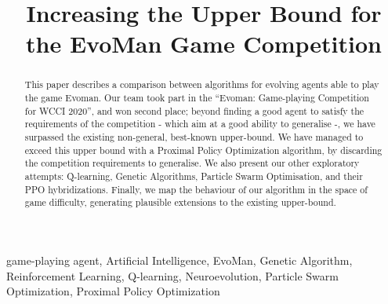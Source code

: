 \documentclass[conference]{IEEEtran}
\begin{document}
    \title{Increasing the Upper Bound for the EvoMan Game Competition}

    \author{
          \and
          
      
        \and
      }

    \maketitle

    \begin{abstract}
      This paper describes a comparison between algorithms for evolving agents able to play the game Evoman.
      Our team took part in the ``Evoman: Game-playing Competition for WCCI 2020'', and won second place;
      beyond finding a good agent to satisfy the requirements of the competition - which aim at a good ability to generalise -,
      we have surpassed the existing non-general, best-known upper-bound.
      We have managed to exceed this upper bound with a Proximal Policy Optimization algorithm, by discarding the competition requirements to generalise.
      We also present our other exploratory attempts: Q-learning, Genetic Algorithms, Particle Swarm Optimisation, and their PPO hybridizations. 
      Finally, we map the behaviour of our algorithm in the space of game difficulty, generating plausible extensions to the existing upper-bound.
    \end{abstract}

    \begin{IEEEkeywords}
        game-playing agent, Artificial Intelligence, EvoMan, Genetic Algorithm, Reinforcement Learning,
        Q-learning, Neuroevolution, Particle Swarm Optimization, Proximal Policy Optimization
    \end{IEEEkeywords}
\end{document}
